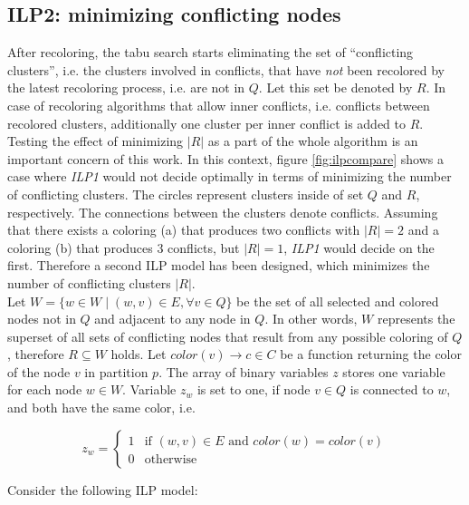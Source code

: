 \subsection{ILP2: minimizing conflicting nodes}
\label{sec:ilp2}
After recoloring, the tabu search starts eliminating the set of ``conflicting clusters'', i.e. the clusters involved in conflicts, that have \textit{not} been recolored by the latest recoloring process, i.e. are not in $Q$. Let this set be denoted by $R$. In case of recoloring algorithms that allow inner conflicts, i.e. conflicts between recolored clusters, additionally one cluster per inner conflict is added to $R$. 
   Testing the effect of minimizing $\left\vert{R}\right\vert$ as a part of the whole algorithm is an important concern of this work. In this context, figure \ref{fig:ilpcompare} shows a case where \textit{ILP1} would not decide optimally in terms of minimizing the number of conflicting clusters. The circles represent clusters inside of set $Q$ and $R$, respectively. The connections between the clusters denote conflicts. Assuming that there exists a coloring (a) that produces two conflicts with $\left\vert{R}\right\vert=2$ and a coloring (b) that produces $3$ conflicts, but $\left\vert{R}\right\vert=1$, \textit{ILP1} would decide on the first. Therefore a second ILP model has been designed, which minimizes the number of conflicting clusters $\left\vert{R}\right\vert$.\\
   
Let $W=\{w\in W \mid (w,v)\in E, \forall v\in Q\}$ be the set of all selected and colored nodes not in $Q$ and adjacent to any node in $Q$. In other words, $W$ represents the superset of all sets of conflicting nodes that result from any possible coloring of $Q$, therefore $R \subseteq W$ holds. Let $color(v)\to c\in C$ be a function returning the color of the node $v$ in partition $p$.
The array of binary variables $z$ stores one variable for each node $w \in W$. Variable $z_w$ is set to one, if node $v \in Q$ is connected to $w$, and both have the same color, i.e.

\begin{equation}
  z_{w}=\begin{cases}
      1 & \text{if } (w,v)\in E \text{ and } color(w)=color(v) \\
      0 & \text{otherwise}
    \end{cases}
  \label{eq4}
\end{equation}

Consider the following ILP model:

